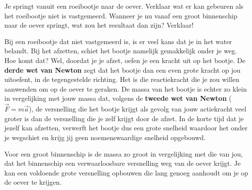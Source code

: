 
\begin{exercise}



Je springt vanuit een roeibootje naar de oever. Verklaar wat er kan gebeuren als het roeibootje niet is vastgemeerd. Wanneer je nu vanaf een groot binnenschip naar de oever springt, wat zou het resultaat dan zijn? Verklaar!
\begin{oplossing}

Bij een roeibootje dat niet vastgemeerd is, is er veel kans dat je in het water belandt. Bij het afzetten, schiet het bootje namelijk gemakkelijk onder je weg. Hoe komt dat? Wel, doordat je je afzet, oefen je een kracht uit op het bootje. De \textbf{derde wet van Newton} zegt dat het bootje dan een even grote kracht op jou uitoefent, in de tegengestelde richting. Het is die reactiekracht die je zou willen aanwenden om op de oever te geraken. De massa van het bootje is echter zo klein in vergelijking met jouw massa dat, volgens de \textbf{tweede wet van Newton} ($\vec{F}=m\vec{a}$), de versnelling die het bootje krijgt als gevolg van jouw actiekracht veel groter is dan de versnelling die je zelf krijgt door de afzet. In de korte tijd dat je jezelf kan afzetten, verwerft het bootje dus een grote snelheid waardoor het onder je wegschiet en krijg jij geen noemenswaardige snelheid opgebouwd.


Voor een groot binnenschip is de massa zo groot in vergelijking met die van jou, dat het binnenschip een verwaarloosbare versnelling weg van de oever krijgt. Je kan een voldoende grote versnelling opbouwen die lang genoeg aanhoudt om je op de oever te krijgen.
\end{oplossing}




\end{exercise}
